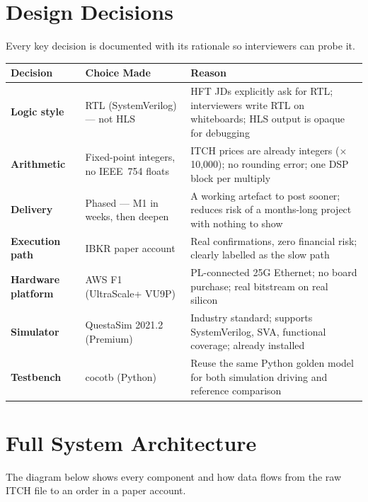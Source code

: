 \documentclass[11pt,a4paper]{article}
\begin{document}
\section{Design Decisions}

Every key decision is documented with its rationale so interviewers can probe it.

\begin{center}
\small
\begin{tabular}{>{\bfseries}p{3.2cm} p{4.8cm} p{5.0cm}}
\toprule
Decision & Choice Made & Reason \\
\midrule
Logic style & RTL (SystemVerilog) — not HLS &
  HFT JDs explicitly ask for RTL; interviewers write RTL on whiteboards;
  HLS output is opaque for debugging \\
\addlinespace
Arithmetic & Fixed-point integers, no IEEE~754 floats &
  ITCH prices are already integers ($\times$10{,}000);
  no rounding error; one DSP block per multiply \\
\addlinespace
Delivery & Phased — M1 in weeks, then deepen &
  A working artefact to post sooner; reduces risk of a months-long project
  with nothing to show \\
\addlinespace
Execution path & IBKR paper account &
  Real confirmations, zero financial risk;
  clearly labelled as the slow path \\
\addlinespace
Hardware platform & AWS F1 (UltraScale+ VU9P) &
  PL-connected 25G Ethernet; no board purchase;
  real bitstream on real silicon \\
\addlinespace
Simulator & QuestaSim 2021.2 (Premium) &
  Industry standard; supports SystemVerilog, SVA,
  functional coverage; already installed \\
\addlinespace
Testbench & cocotb (Python) &
  Reuse the same Python golden model for both
  simulation driving and reference comparison \\
\bottomrule
\end{tabular}
\end{center}

\section{Full System Architecture}

The diagram below shows every component and how data flows from the raw ITCH
file to an order in a paper account.
\end{document}
